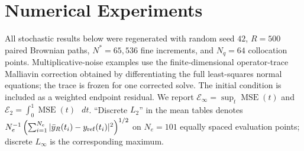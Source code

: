 \documentclass[11pt, a4paper]{article}
\theoremstyle{theoremstyle}
\theoremstyle{definitionstyle}
\newcommand{\dd}{\mathop{}\!d}
\begin{document}
\section{Numerical Experiments}

All stochastic results below were regenerated with random seed $42$, $R=500$
paired Brownian paths, $N^*=65{,}536$ fine increments, and $N_q=64$
collocation points.  Multiplicative-noise examples use the finite-dimensional
operator-trace Malliavin correction obtained by differentiating the full
least-squares normal equations; the trace is frozen for one corrected solve.
The initial condition is included as a weighted endpoint residual.  We report
$\mathcal E_\infty=\sup_t\operatorname{MSE}(t)$ and
$\mathcal E_2=\int_0^1\operatorname{MSE}(t)\,\dd t$.  ``Discrete $L_2$'' in
the mean tables denotes $N_e^{-1}\left(\sum_{i=1}^{N_e}
|\bar y_R(t_i)-y_{\rm ref}(t_i)|^2\right)^{1/2}$ on $N_e=101$ equally
spaced evaluation points; discrete $L_\infty$ is the corresponding maximum.
\end{document}
